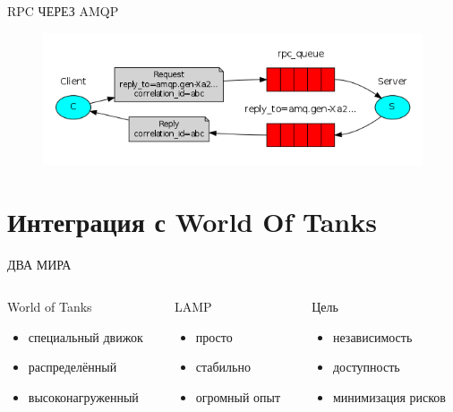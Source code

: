 \documentclass[aspectratio=169]{beamer}
\begin{document}
\begin{frame}[fragile]{RPC ЧЕРЕЗ AMQP}
    \begin{figure}[htb]
        \includegraphics[width=\textwidth]{rpc.png}
    \end{figure}
\end{frame}

\section{Интеграция с World Of Tanks}
\begin{frame}{ДВА МИРА}
    \begin{columns}

    \begin{column}{0.33\textwidth}
    \begin{block}{World of Tanks}
        \begin{itemize}
            \item специальный движок
            \item распределённый
            \item высоконагруженный
        \end{itemize}
    \end{block}
    \end{column}
     
    \begin{column}{0.33\textwidth}
    \begin{block}{LAMP}
        \begin{itemize}
            \item просто
            \item стабильно
            \item огромный опыт
        \end{itemize}
    \end{block}
    \end{column}

    \begin{column}{0.33\textwidth}
    \begin{block}{Цель}
        \begin{itemize}
            \item независимость
            \item доступность
            \item минимизация рисков
        \end{itemize}
    \end{block}
    \end{column}

    \end{columns}
\end{frame}
\end{document}
